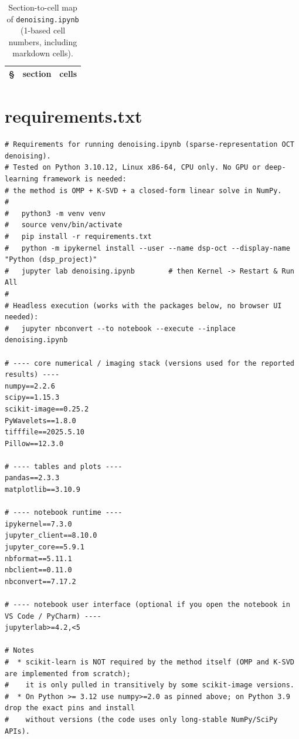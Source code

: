 \documentclass[11pt,a4paper]{article}
\begin{document}
\begin{table}[H]
\centering
\caption{Section-to-cell map of \texttt{denoising.ipynb} (1-based cell numbers, including markdown cells).}
\label{tab:cells}
\footnotesize
\begin{tabular}{@{}c l l@{}}
\toprule
\S & section & cells\\
\midrule

\bottomrule
\end{tabular}
\end{table}

\section{requirements.txt}\label{app:req}

{\footnotesize
\begin{lstlisting}[style=plain]
# Requirements for running denoising.ipynb (sparse-representation OCT denoising).
# Tested on Python 3.10.12, Linux x86-64, CPU only. No GPU or deep-learning framework is needed:
# the method is OMP + K-SVD + a closed-form linear solve in NumPy.
#
#   python3 -m venv venv
#   source venv/bin/activate
#   pip install -r requirements.txt
#   python -m ipykernel install --user --name dsp-oct --display-name "Python (dsp_project)"
#   jupyter lab denoising.ipynb        # then Kernel -> Restart & Run All
#
# Headless execution (works with the packages below, no browser UI needed):
#   jupyter nbconvert --to notebook --execute --inplace denoising.ipynb

# ---- core numerical / imaging stack (versions used for the reported results) ----
numpy==2.2.6
scipy==1.15.3
scikit-image==0.25.2
PyWavelets==1.8.0
tifffile==2025.5.10
Pillow==12.3.0

# ---- tables and plots ----
pandas==2.3.3
matplotlib==3.10.9

# ---- notebook runtime ----
ipykernel==7.3.0
jupyter_client==8.10.0
jupyter_core==5.9.1
nbformat==5.11.1
nbclient==0.11.0
nbconvert==7.17.2

# ---- notebook user interface (optional if you open the notebook in VS Code / PyCharm) ----
jupyterlab>=4.2,<5

# Notes
#  * scikit-learn is NOT required by the method itself (OMP and K-SVD are implemented from scratch);
#    it is only pulled in transitively by some scikit-image versions.
#  * On Python >= 3.12 use numpy>=2.0 as pinned above; on Python 3.9 drop the exact pins and install
#    without versions (the code uses only long-stable NumPy/SciPy APIs).
\end{lstlisting}
}
\end{document}
